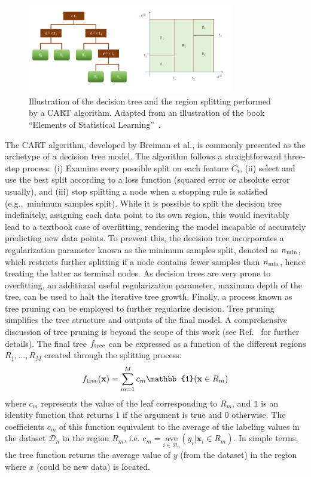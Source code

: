 \documentclass[main]{subfiles}
\begin{document}
\begin{figure}[ht]
  \centering
  \includegraphics[width=0.8\textwidth]{figures/4-ml/decision_tree.pdf}
  \caption{Illustration of the decision tree and the region splitting performed by a CART\autocite{Breiman_2017} algorithm. Adapted from an illustration of the book ``Elements of Statistical Learning''~\cite{Hastie_2009}. }\label{fgr:tree}
\end{figure}

The CART\autocite{Breiman_2017} algorithm, developed by Breiman et al., is commonly presented as the archetype of a decision tree model. The algorithm follows a straightforward three-step process: (i) Examine every possible split on each feature $C_i$, (ii) select and use the best split according to a loss function (squared error or absolute error usually), and (iii) stop splitting a node when a stopping rule is satisfied (e.g.,\ minimum samples split).\autocite{Dension_1998} While it is possible to split the decision tree indefinitely, assigning each data point to its own region, this would inevitably lead to a textbook case of overfitting, rendering the model incapable of accurately predicting new data points. To prevent this, the decision tree incorporates a regularization parameter known as the minimum samples split, denoted as $n_{\text{min}}$, which restricts further splitting if a node contains fewer samples than $n_{\text{min}}$, hence treating the latter as terminal nodes. As decision trees are very prone to overfitting, an additional useful regularization parameter, maximum depth of the tree, can be used to halt the iterative tree growth. Finally, a process known as tree pruning can be employed to further regularize decision. Tree pruning simplifies the tree structure and outputs of the final model. A comprehensive discussion of tree pruning is beyond the scope of this work (see Ref.~\cite{Hastie_2009} for further details). The final tree $f_{\text{tree}}$ can be expressed as a function of the different regions $R_1,\ldots,R_M$ created through the splitting process:
\begin{equation}
  f\e{tree}(\mathbf{x}) = \sum_{m=1}^M c_m \mathbb{1}(\mathbf{x}\in R_m)
\end{equation}
where $c_m$ represents the value of the leaf corresponding to $R_m$, and $\mathbb{1}$ is an identity function that returns $1$ if the argument is true and $0$ otherwise. The coefficients $c_m$ of this function equivalent to the average of the labeling values in the dataset $\mathcal{D}_n$ in the region $R_m$, i.e. $c_m= \underset{i\in \mathcal{D}_n}{\text{ave}}(y_i|\mathbf{x}_i\in R_m)$.
In simple terms, the tree function returns the average value of $y$ (from the dataset) in the region where $x$ (could be new data) is located. 
\end{document}
